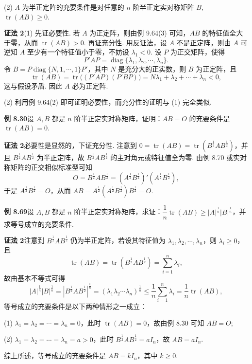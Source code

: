 \documentclass[UTF8, 12pt, fontset=fandol, oneside]{ctexart}
\begin{document}
(2) $A$ 为半正定阵的充要条件是对任意的 $n$ 阶半正定实对称矩阵 $B$, $\operatorname{tr}(AB)\ge0$.

\noindent\textbf{证法 2}\quad (1) 先证必要性. 若 $A$ 为正定阵，则由例 9.64(3) 可知，$AB$ 的特征值全大于零，从而 $\operatorname{tr}(AB)>0$. 再证充分性. 用反证法，设 $A$ 不是正定阵，则由 $A$ 可逆知 $A$ 至少有一个特征值小于零，不妨设 $\lambda_1<0$. 设 $P$ 为正交矩阵，使得
\[
P'AP=\operatorname{diag}\{\lambda_1,\lambda_2,\cdots,\lambda_n\}.
\]
令 $B=P\operatorname{diag}\{N,1,\cdots,1\}P'$，其中 $N$ 是充分大的正实数，则 $B$ 为正定阵，且
\[
\operatorname{tr}(AB)=\operatorname{tr}\bigl((P'AP)(P'BP)\bigr)=N\lambda_1+\lambda_2+\cdots+\lambda_n<0,
\]
这与假设矛盾. 因此 $A$ 必为正定阵.

(2) 利用例 9.64(2) 即可证明必要性，而充分性的证明与 (1) 完全类似.

\noindent\textbf{例 8.30}\quad 设 $A,B$ 都是 $n$ 阶半正定实对称矩阵，证明：$AB=O$ 的充要条件是 $\operatorname{tr}(AB)=0$.

\noindent\textbf{证法 2}\quad 必要性是显然的，下证充分性. 注意到 $0=\operatorname{tr}(AB)=\operatorname{tr}(B^{\frac12}AB^{\frac12})$，并且 $B^{\frac12}AB^{\frac12}$ 为半正定阵，故 $B^{\frac12}AB^{\frac12}$ 的主对角元或特征值全为零. 由例 8.70 或实对称矩阵的正交相似标准型可知
\[
O=B^{\frac12}AB^{\frac12}=(A^{\frac12}B^{\frac12})'(A^{\frac12}B^{\frac12}),
\]
于是 $A^{\frac12}B^{\frac12}=O$，从而 $AB=A^{\frac12}(A^{\frac12}B^{\frac12})B^{\frac12}=O$.

\noindent\textbf{例 8.69}\quad 设 $A,B$ 都是 $n$ 阶半正定实对称矩阵，求证：$\dfrac1n\operatorname{tr}(AB)\ge |A|^{\frac1n}|B|^{\frac1n}$，并求等号成立的充要条件.

\noindent\textbf{证法 2}\quad 注意到 $B^{\frac12}AB^{\frac12}$ 仍为半正定阵，若设其特征值为 $\lambda_1,\lambda_2,\cdots,\lambda_n$，则 $\lambda_i\ge0$，且
\[
\operatorname{tr}(AB)=\operatorname{tr}(B^{\frac12}AB^{\frac12})=\sum_{i=1}^n\lambda_i,
\]
故由基本不等式可得
\[
|A|^{\frac1n}|B|^{\frac1n}=|B^{\frac12}AB^{\frac12}|^{\frac1n}
=(\lambda_1\lambda_2\cdots\lambda_n)^{\frac1n}
\le \frac1n\sum_{i=1}^n\lambda_i=\frac1n\operatorname{tr}(AB),
\]
等号成立的充要条件是以下两种情形之一成立：

(1) $\lambda_1=\lambda_2=\cdots=\lambda_n=0$，此时 $\operatorname{tr}(AB)=0$，故由例 8.30 可知 $AB=O$;

(2) $\lambda_1=\lambda_2=\cdots=\lambda_n=a>0$，此时 $B^{\frac12}AB^{\frac12}=aI_n$，故 $AB=aI_n$.

综上所述，等号成立的充要条件是 $AB=kI_n$，其中 $k\ge0$.
\end{document}

